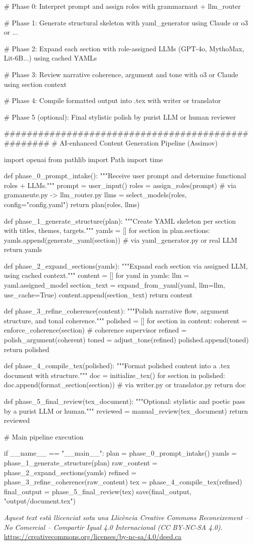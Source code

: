\documentclass[12pt,a4paper]{article}
\begin{document}
			
\newpage

\begin{metaoutput}
# Phase 0: Interpret prompt and assign roles with grammarnaut + llm_router
	
# Phase 1: Generate structural skeleton with yaml_generator using Claude or o3 or ...
	
# Phase 2: Expand each section with role-assigned LLMs (GPT-4o, MythoMax, Lit-6B...) using cached YAMLs
	
# Phase 3: Review narrative coherence, argument and tone with o3 or Claude using section context
	
# Phase 4: Compile formatted output into .tex with writer or translator
	
# Phase 5 (optional): Final stylistic polish by purist LLM or human reviewer
	
###################################################
# AI-enhanced Content Generation Pipeline (Assimov)
	
import openai
from pathlib import Path
import time
	
def phase_0_prompt_intake():
	"""Receive user prompt and determine functional roles + LLMs."""
	prompt = user_input()
	roles = assign_roles(prompt)  # via gramaneute.py -> llm_router.py
	llms = select_models(roles, config="config.yaml")
	return plan(roles, llms)
	
def phase_1_generate_structure(plan):
	"""Create YAML skeleton per section with titles, themes, targets."""
	yamls = []
	for section in plan.sections:
		yamls.append(generate_yaml(section))  # via yaml_generator.py or real LLM
	return yamls
	
def phase_2_expand_sections(yamls):
	"""Expand each section via assigned LLM, using cached context."""
	content = []
	for yaml in yamls:
		llm = yaml.assigned_model
		section_text = expand_from_yaml(yaml, llm=llm, use_cache=True)
		content.append(section_text)
	return content
	
def phase_3_refine_coherence(content):
	"""Polish narrative flow, argument structure, and tonal coherence."""
	polished = []
	for section in content:
		coherent = enforce_coherence(section)  # coherence supervisor
		refined = polish_argument(coherent)
		toned = adjust_tone(refined)
		polished.append(toned)
	return polished
	
def phase_4_compile_tex(polished):
	"""Format polished content into a .tex document with structure."""
	doc = initialize_tex()
	for section in polished:
		doc.append(format_section(section))  # via writer.py or translator.py
	return doc
	
def phase_5_final_review(tex_document):
	"""Optional: stylistic and poetic pass by a purist LLM or human."""
	reviewed = manual_review(tex_document)
	return reviewed
	
	# Main pipeline execution
	
if __name__ == "__main__":
	plan = phase_0_prompt_intake()
	yamls = phase_1_generate_structure(plan)
	raw_content = phase_2_expand_sections(yamls)
	refined = phase_3_refine_coherence(raw_content)
	tex = phase_4_compile_tex(refined)
	final_output = phase_5_final_review(tex)
	save(final_output, "output/document.tex")				
\end{metaoutput}
\noindent
\textit{Aquest text està llicenciat sota una Llicència Creative Commons Reconeixement – No Comercial – Compartir Igual 4.0 Internacional (CC BY-NC-SA 4.0).}\\ \url{https://creativecommons.org/licenses/by-nc-sa/4.0/deed.ca}
\end{document}
